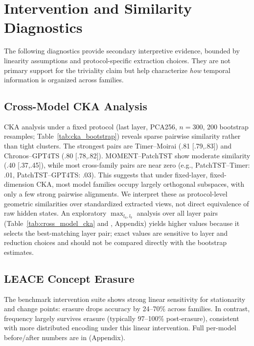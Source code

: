 \documentclass{article}
\begin{document}
\section{Intervention and Similarity Diagnostics}
\label{sec:diagnostics}

The following diagnostics provide secondary interpretive evidence, bounded by linearity assumptions and protocol-specific extraction choices. They are not primary support for the triviality claim but help characterize \emph{how} temporal information is organized across families.

\subsection{Cross-Model CKA Analysis}

CKA analysis under a fixed protocol (last layer, PCA256, $n=300$, 200 bootstrap resamples; Table~\ref{tab:cka_bootstrap}) reveals sparse pairwise similarity rather than tight clusters. The strongest pairs are Timer--Moirai (.81 [.79,.83]) and Chronos--GPT4TS (.80 [.78,.82]). MOMENT--PatchTST show moderate similarity (.40 [.37,.45]), while most cross-family pairs are near zero (e.g., PatchTST--Timer: .01, PatchTST--GPT4TS: .03). This suggests that under fixed-layer, fixed-dimension CKA, most model families occupy largely orthogonal subspaces, with only a few strong pairwise alignments. We interpret these as protocol-level geometric similarities over standardized extracted views, not direct equivalence of raw hidden states. An exploratory $\max_{l_a,l_b}$ analysis over all layer pairs (Table~\ref{tab:cross_model_cka} and , Appendix) yields higher values because it selects the best-matching layer pair; exact values are sensitive to layer and reduction choices and should not be compared directly with the bootstrap estimates.

\subsection{LEACE Concept Erasure}

The benchmark intervention suite shows strong linear sensitivity for stationarity and change points: erasure drops accuracy by 24--70\% across families. In contrast, frequency largely survives erasure (typically 97--100\% post-erasure), consistent with more distributed encoding under this linear intervention. Full per-model before/after numbers are in  (Appendix).
\end{document}
